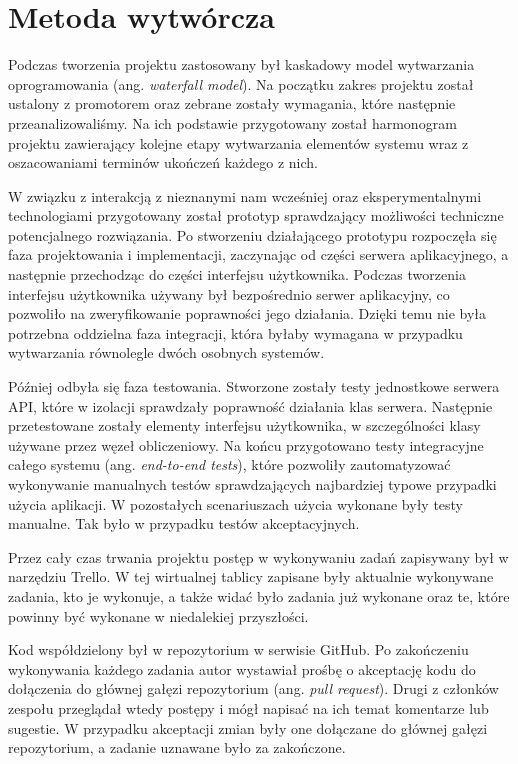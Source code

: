 \documentclass[a4paper,11pt,twoside]{report}
\theoremstyle{definition}
\begin{document}
\section{Metoda wytwórcza}
    Podczas tworzenia projektu zastosowany był kaskadowy model wytwarzania oprogramowania (ang. \textit{waterfall model}).
    Na początku zakres projektu został ustalony z promotorem oraz zebrane zostały wymagania, które następnie przeanalizowaliśmy.
    Na ich podstawie przygotowany został harmonogram projektu zawierający kolejne etapy wytwarzania elementów systemu
    wraz z oszacowaniami terminów ukończeń każdego z nich.
    
    W związku z interakcją z nieznanymi nam wcześniej oraz eksperymentalnymi technologiami przygotowany został prototyp
    sprawdzający możliwości techniczne potencjalnego rozwiązania.
    Po stworzeniu działającego prototypu rozpoczęła się faza projektowania i implementacji, zaczynając od części serwera aplikacyjnego,
    a następnie przechodząc do części interfejsu użytkownika.
    Podczas tworzenia interfejsu użytkownika używany był bezpośrednio serwer aplikacyjny, co pozwoliło na zweryfikowanie
    poprawności jego działania.
    Dzięki temu nie była potrzebna oddzielna faza integracji, która byłaby wymagana w przypadku wytwarzania
    równolegle dwóch osobnych systemów.
    
    Później odbyła się faza testowania.
    Stworzone zostały testy jednostkowe serwera API, które w izolacji sprawdzały poprawność działania klas serwera.
    Następnie przetestowane zostały elementy interfejsu użytkownika, w szczególności klasy używane przez węzeł obliczeniowy.
    Na końcu przygotowano testy integracyjne całego systemu (ang. \textit{end-to-end tests}),
    które pozwoliły zautomatyzować wykonywanie manualnych testów sprawdzających najbardziej typowe przypadki
    użycia aplikacji.
    W pozostałych scenariuszach użycia wykonane były testy manualne.
    Tak było w przypadku testów akceptacyjnych.
    
    Przez cały czas trwania projektu postęp w wykonywaniu zadań zapisywany był w narzędziu Trello.
    W tej wirtualnej tablicy zapisane były aktualnie wykonywane zadania, kto je wykonuje, a także
    widać było zadania już wykonane oraz te, które powinny być wykonane w niedalekiej przyszłości.
    
    Kod współdzielony był w repozytorium w serwisie GitHub.
    Po zakończeniu wykonywania każdego zadania autor wystawiał prośbę o akceptację kodu do dołączenia
    do głównej gałęzi repozytorium (ang. \textit{pull request}).
    Drugi z członków zespołu przeglądał wtedy postępy i mógł napisać na ich temat komentarze lub sugestie.
    W przypadku akceptacji zmian były one dołączane do głównej gałęzi repozytorium, a zadanie uznawane było
    za zakończone.
    
\end{document}
